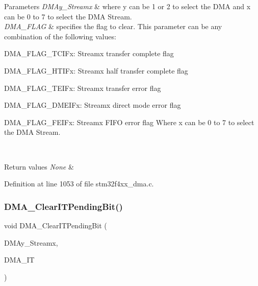 \begin{DoxyParams}{Parameters}
{\em D\+M\+Ay\+\_\+\+Streamx} & where y can be 1 or 2 to select the D\+MA and x can be 0 to 7 to select the D\+MA Stream. \\
\hline
{\em D\+M\+A\+\_\+\+F\+L\+AG} & specifies the flag to clear. This parameter can be any combination of the following values\+: \begin{DoxyItemize}
\item D\+M\+A\+\_\+\+F\+L\+A\+G\+\_\+\+T\+C\+I\+Fx\+: Streamx transfer complete flag \item D\+M\+A\+\_\+\+F\+L\+A\+G\+\_\+\+H\+T\+I\+Fx\+: Streamx half transfer complete flag \item D\+M\+A\+\_\+\+F\+L\+A\+G\+\_\+\+T\+E\+I\+Fx\+: Streamx transfer error flag \item D\+M\+A\+\_\+\+F\+L\+A\+G\+\_\+\+D\+M\+E\+I\+Fx\+: Streamx direct mode error flag \item D\+M\+A\+\_\+\+F\+L\+A\+G\+\_\+\+F\+E\+I\+Fx\+: Streamx F\+I\+FO error flag Where x can be 0 to 7 to select the D\+MA Stream. \end{DoxyItemize}
\\
\hline
\end{DoxyParams}

\begin{DoxyRetVals}{Return values}
{\em None} & \\
\hline
\end{DoxyRetVals}


Definition at line 1053 of file stm32f4xx\+\_\+dma.\+c.

\mbox{\label{group___d_m_a___group4_gad5433018889cd36140d98bb380c4e76e}} 
\subsubsection{\texorpdfstring{D\+M\+A\+\_\+\+Clear\+I\+T\+Pending\+Bit()}{DMA\_ClearITPendingBit()}}
{\footnotesize\ttfamily void D\+M\+A\+\_\+\+Clear\+I\+T\+Pending\+Bit (\begin{DoxyParamCaption}\item[{\hyperlink{struct_d_m_a___stream___type_def}{D\+M\+A\+\_\+\+Stream\+\_\+\+Type\+Def} $\ast$}]{D\+M\+Ay\+\_\+\+Streamx,  }\item[{uint32\+\_\+t}]{D\+M\+A\+\_\+\+IT }\end{DoxyParamCaption})}




